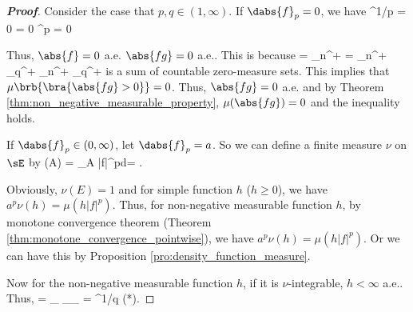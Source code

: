 \begin{proof}[\bf Proof]
Consider the case that $p,q \in (1,\infty)$. If $\dabs{f}_p = 0$, we have
\be
{}^{1/p} = 0 \quad\ra\quad {} = 0 \quad\ra\quad {}^p = 0 \ 
\ee

Thus, $\abs{f}= 0$ a.e. $\abs{fg} = 0$ a.e.. This is because
\be
{} = \bigcup_{n\in \Z^+}  = \bigcup_{n\in \Z^+} \bigcup_{q\in \R^+} \cap {} \subseteq \bigcup_{n\in \Z^+} \bigcup_{q\in \R^+} 
\ee
is a sum of countable zero-measure sets. This implies that $\mu\brb{\bra{\abs{fg} > 0}} = 0$. Thus, $\abs{fg} = 0$ a.e. and by Theorem \ref{thm:non_negative_measurable_property}, $\mu(\abs{fg}) = 0$ and the inequality holds.


If $\dabs{f}_p \in (0,\infty)$, let $\dabs{f}_p = a$. So we can define a finite measure $\nu$ on $\sE$ by
\be
\nu(A) = \int_A |f|^pd\mu =  \mu {}.
\ee

Obviously, $\nu(E)=1$ and for simple function $h$ ($h\geq 0$), we have $a^p\nu(h) = \mu(h|f|^p)$. Thus, for non-negative measurable function $h$, by monotone convergence theorem (Theorem \ref{thm:monotone_convergence_pointwise}), we have $a^p\nu(h) = \mu(h|f|^p)$. Or we can have this by Proposition \ref{pro:density_function_measure}.

Now for the non-negative measurable function $h$, if it is $\nu$-integrable, $h<\infty$ a.e.. %
Thus,
\beast
\nu {} = _{} \leq {}_{}\leq {}_{} = \nu{}^{1/q} \qquad (*).
\eeast


\end{proof}
